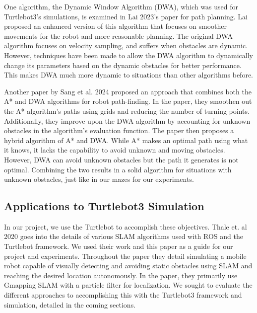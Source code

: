 \documentclass{article}
\begin{document}
One algorithm, the Dynamic Window Algorithm (DWA), which was used for Turtlebot3's simulations, is examined in Lai 2023's paper for path planning. Lai proposed an enhanced version of this algorithm that focuses on smoother movements for the robot and more reasonable planning. The original DWA algorithm focuses on velocity sampling, and suffers when obstacles are dynamic. However, techniques have been made to allow the DWA algorithm to dynamically change its parameters based on the dynamic obstacles for better performance. This makes DWA much more dynamic to situations than other algorithms before. 

Another paper by Sang et al. 2024 proposed an approach that combines both the A* and DWA algorithms for robot path-finding. In the paper, they smoothen out the A* algorithm's paths using grids and reducing the number of turning points. Additionally, they improve upon the DWA algorithm by accounting for unknown obstacles in the algorithm's evaluation function. The paper then proposes a hybrid algorithm of A* and DWA. While A* makes an optimal path using what it knows, it lacks the capability to avoid unknown and moving obstacles. However, DWA can avoid unknown obstacles but the path it
generates is not optimal. Combining the two results in a solid algorithm for situations with unknown obstacles, just like in our mazes for our experiments.

\subsection{Applications to Turtlebot3 Simulation}


In our project, we use the Turtlebot to accomplish these objectives. Thale et. al 2020 goes into the details of various SLAM algorithms used with ROS and the Turtlebot framework. We used their work and this paper as a guide for our project and experiments. Throughout the paper they detail simulating a mobile robot capable of visually detecting and
avoiding static obstacles using SLAM and reaching the desired
location autonomously. In the paper, they primarily use Gmapping SLAM with a particle filter for localization. We sought to evaluate the different approaches to accomplishing this with the Turtlebot3 framework and simulation, detailed in the coming sections. 

\end{document}

